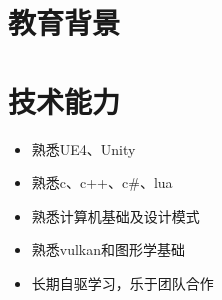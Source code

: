 \documentclass{resume}
\begin{document}



\section{教育背景}

\section{技术能力}
\begin{itemize}[parsep=0.2ex]
  \item 熟悉UE4、Unity
  \item 熟悉c、c++、c\#、lua
  \item 熟悉计算机基础及设计模式
  \item 熟悉vulkan和图形学基础
  \item 长期自驱学习，乐于团队合作
\end{itemize}

\end{document}
